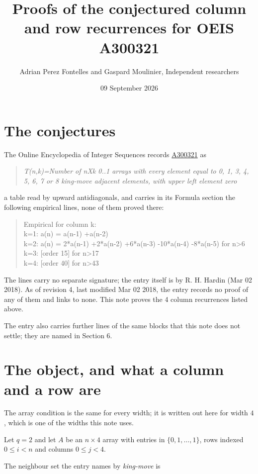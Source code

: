 \documentclass[11pt]{article}
\title{Proofs of the conjectured column and row recurrences for OEIS A300321}
\author{Adrian Perez Fontelles and Gaspard Moulinier, Independent researchers}
\date{09 September 2026}
\theoremstyle{definition}
\begin{document}
\maketitle
\section{The conjectures}

The Online Encyclopedia of Integer Sequences records \href{https://oeis.org/A300321}{A300321} as

\begin{quote}\itshape T(n,k)=Number of nXk 0..1 arrays with every element equal to 0, 1, 3, 4, 5, 6, 7 or 8 king-move adjacent elements, with upper left element zero\end{quote}

a table read by upward antidiagonals, and carries in its Formula section the following empirical lines, none of them proved there:

\begin{quote}\ttfamily Empirical for column k:\\
k=1: a(n) = a(n-1) +a(n-2)\\k=2: a(n) = 2*a(n-1) +2*a(n-2) +6*a(n-3) -10*a(n-4) -8*a(n-5) for n>6\\k=3: [order 15] for n>17\\k=4: [order 40] for n>43\end{quote}

The lines carry no separate signature; the entry itself is by R. H. Hardin (Mar 02 2018). As of revision 4, last modified Mar 02 2018, the entry records no proof of any of them and links to none. This note proves the 4 column recurrences listed above.

The entry also carries further lines of the same blocks that this note does not settle; they are named in Section 6.

\section{The object, and what a column and a row are}

The array condition is the same for every width; it is written out here for width $4$, which is one of the widths this note uses.

Let $q = 2$ and let $A$ be an $n \times 4$ array with entries in $\{0,1,\dots,1\}$, rows indexed $0 \le i < n$ and columns $0 \le j < 4$.

The neighbour set the entry names by {\itshape king-move} is
\end{document}
